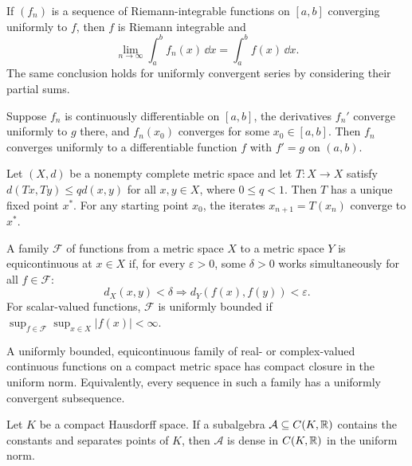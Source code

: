 \begin{theorem}
If $(f_n)$ is a sequence of Riemann-integrable functions on $[a,b]$ converging uniformly to $f$, then $f$ is Riemann integrable and
\[
 \lim_{n\to\infty}\int_a^b f_n(x)\,\dd x
 =\int_a^b f(x)\,\dd x.
\]
The same conclusion holds for uniformly convergent series by considering their partial sums.
\end{theorem}

\begin{theorem}
Suppose $f_n$ is continuously differentiable on $[a,b]$, the derivatives $f_n'$ converge uniformly to $g$ there, and $f_n(x_0)$ converges for some $x_0\in[a,b]$. Then $f_n$ converges uniformly to a differentiable function $f$ with $f'=g$ on $(a,b)$.
\end{theorem}

\begin{theorem}
Let $(X,d)$ be a nonempty complete metric space and let $T\colon X\to X$ satisfy $d(Tx,Ty)\le qd(x,y)$ for all $x,y\in X$, where $0\le q<1$. Then $T$ has a unique fixed point $x^*$. For any starting point $x_0$, the iterates $x_{n+1}=T(x_n)$ converge to $x^*$.
\end{theorem}

\begin{definition}
A family $\mathcal{F}$ of functions from a metric space $X$ to a metric space $Y$ is equicontinuous at $x\in X$ if, for every $\varepsilon>0$, some $\delta>0$ works simultaneously for all $f\in\mathcal{F}$:
\[
 d_X(x,y)<\delta\Longrightarrow d_Y(f(x),f(y))<\varepsilon.
\]
For scalar-valued functions, $\mathcal{F}$ is uniformly bounded if $\sup_{f\in\mathcal{F}}\sup_{x\in X}|f(x)|<\infty$.
\end{definition}

\begin{theorem}
A uniformly bounded, equicontinuous family of real- or complex-valued continuous functions on a compact metric space has compact closure in the uniform norm. Equivalently, every sequence in such a family has a uniformly convergent subsequence.
\end{theorem}

\begin{theorem}
Let $K$ be a compact Hausdorff space. If a subalgebra $\mathcal{A}\subseteq C(K,\mathbb{R})$ contains the constants and separates points of $K$, then $\mathcal{A}$ is dense in $C(K,\mathbb{R})$ in the uniform norm.
\end{theorem}

